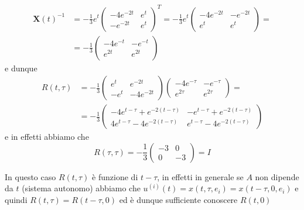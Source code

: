 \begin{example}
    \begin{align*}
        \mathbf{X}{(t)}^{-1} &= -\frac{1}{3}e^{t} \begin{pmatrix}
          -4e^{-2t} & e^{t} \\
          -e^{-2t} & e^{t}
      \end{pmatrix}^{T} = -\frac{1}{3}e^{t} \begin{pmatrix}
          -4e^{-2t} & -e^{-2t} \\
          e^{t} & e^{t}
          \end{pmatrix} = \\ &= -\frac{1}{3} \begin{pmatrix}
          -4e^{-t} & -e^{-t} \\
          e^{2t} & e^{2t}
      \end{pmatrix}
    \end{align*}
    e dunque
    \begin{align*}
        R{(t, \tau)} &= -\frac{1}{3} \begin{pmatrix}
          e^{t} & e^{-2t} \\
          -e^{t} & -4e^{-2t}
          \end{pmatrix} \begin{pmatrix}
          -4e^{-\tau} & -e^{-\tau} \\
          e^{2\tau} & e^{2\tau}
          \end{pmatrix} = \\ &= -\frac{1}{3} \begin{pmatrix}
          -4e^{t-\tau}+e^{-2{(t-\tau)}} & -e^{t-\tau} + e^{-2{(t-\tau)}} \\
          4e^{t-\tau} - 4e^{-2{(t-\tau)}} & e^{t-\tau} - 4e^{-2{(t-\tau)}}
      \end{pmatrix}
    \end{align*}
    e in effetti abbiamo che
    \[
      R{(\tau, \tau)} = -\frac{1}{3} \begin{pmatrix}
          -3 & 0 \\
          0 & -3
      \end{pmatrix} = I
    \]
    \begin{remark}
        In questo caso \(R{(t, \tau)}\) è funzione di \(t - \tau\), in effetti
        in generale se \(A\) non dipende da \(t\)  (sistema autonomo) abbiamo
        che \(u^{{(i)}}{(t)} = x{(t, \tau, e_{i})} = x{(t-\tau, 0, e_{i})}\) e
        quindi
        \(R{(t, \tau)} = R{(t-\tau, 0)}\) ed è dunque sufficiente conoscere
        \(R{(t, 0)}\) 
    \end{remark}
\end{example}

